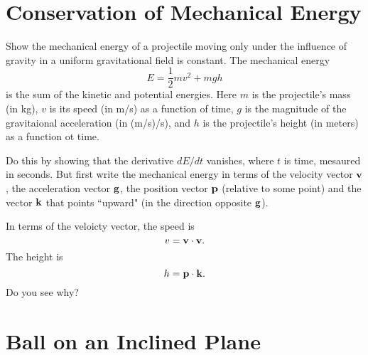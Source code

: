 \documentclass{ximera}
\begin{document}
\section{Conservation of Mechanical Energy}
\begin{question} \label{Q4re4r4rfefe}
Show the mechanical energy of a projectile moving only under the influence of gravity in a uniform gravitational field is constant. The mechanical energy
\[
   E = \frac{1}{2}mv^2 + mgh
\]
is the sum of the kinetic and potential energies. Here $m$ is the projectile's mass (in kg), $v$ is its speed (in m/s) as a function of time, $g$ is the magnitude of the gravitaional acceleration (in (m/s)/s), and $h$ is the projectile's height (in meters) as a function ot time. 

Do this by showing that the derivative $dE/dt$ vanishes, where $t$ is time, mesaured in seconds. But first write the mechanical energy in terms of the velocity vector ${\bf v}$, the acceleration vector ${\bf g}$, the position vector ${\bf p}$ (relative to some point) and the vector ${\bf k}$ that points ``upward" (in the direction opposite ${\bf g}$).

\begin{hint}
In terms of the veloicty vector, the speed is
\[
   v = {\bf v}\cdot {\bf v}.
\]
The height is
\[
     h = {\bf p}\cdot {\bf k} .
\]
Do you see why?
\end{hint}
\end{question}



\section{Ball on an Inclined Plane}
\end{document}
